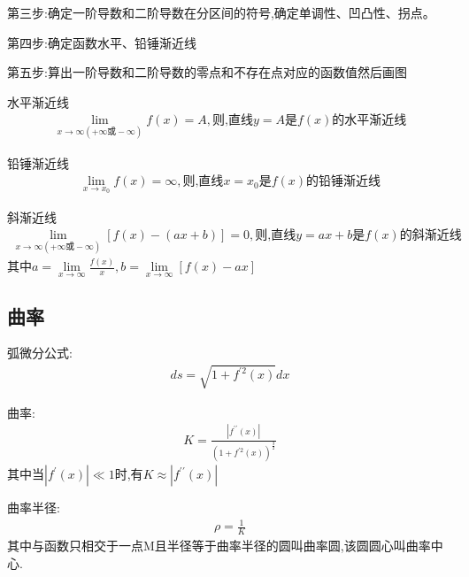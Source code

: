 \documentclass[utf8]{ctexart}
\begin{document}
第三步:确定一阶导数和二阶导数在分区间的符号,确定单调性、凹凸性、拐点。

第四步:确定函数水平、铅锤渐近线

第五步:算出一阶导数和二阶导数的零点和不存在点对应的函数值然后画图

水平渐近线
\begin{align}
    \displaystyle\lim\limits_{x\to \infty(+\infty\text{或}-\infty)}f(x)=A,\text{则,直线}y=A\text{是}f(x)\text{的水平渐近线}
\end{align}

铅锤渐近线
\begin{align}
    \displaystyle\lim\limits_{x\to x_{0}}f(x)=\infty,\text{则,直线}x=x_{0}\text{是}f(x)\text{的铅锤渐近线}
\end{align}

斜渐近线
\begin{align}
    \displaystyle\lim\limits_{x\to \infty(+\infty\text{或}-\infty)}[f(x)-(ax+b)]=0,\text{则,直线}y=ax+b\text{是}f(x)\text{的斜渐近线}
\end{align}
其中$a=\displaystyle\lim\limits_{x\to \infty}\frac{f(x)}{x},b=\displaystyle\lim\limits_{x\to \infty}[f(x)-ax]$

\subsection{\heiti 曲率}

弧微分公式:
\begin{align}
    d{s}=\sqrt{1+f^{\prime 2}(x)}d{x} 
\end{align}

曲率:\begin{align}
    K=\displaystyle\frac{|f^{\prime \prime }(x)|}{(1+f^{\prime 2}(x))^{\frac{3}{2}}}
\end{align}
其中当$|f^{\prime }(x)|\ll 1$时,有$K\approx |f^{\prime \prime }(x)|$

曲率半径:\begin{align}
    \rho =\frac{1}{K}
\end{align}
其中与函数只相交于一点M且半径等于曲率半径的圆叫曲率圆,该圆圆心叫曲率中心.
\end{document}
